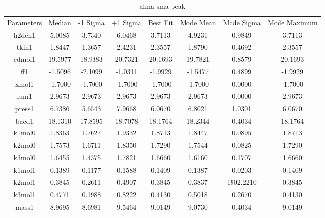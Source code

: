 \begin{table}
\caption{alma sma peak}
\begin{tabular}{cccccccc}
Parameters & Median & -1 Sigma & +1 Sigma & Best Fit & Mode Mean & Mode Sigma & Mode Maximum \\
h2den1 & 5.0085 & 3.7340 & 6.0468 & 3.7113 & 4.9231 & 0.9849 & 3.7113 \\
tkin1 & 1.8447 & 1.3657 & 2.4231 & 2.3557 & 1.8790 & 0.4692 & 2.3557 \\
cdmol1 & 19.5977 & 18.9383 & 20.7321 & 20.1693 & 19.7821 & 0.8579 & 20.1693 \\
ff1 & -1.5096 & -2.1099 & -1.0311 & -1.9929 & -1.5477 & 0.4899 & -1.9929 \\
xmol1 & -1.7000 & -1.7000 & -1.7000 & -1.7000 & -1.7000 & 0.0000 & -1.7000 \\
lum1 & 2.9673 & 2.9673 & 2.9673 & 2.9673 & 2.9673 & 0.0000 & 2.9673 \\
press1 & 6.7386 & 5.6543 & 7.9668 & 6.0670 & 6.8021 & 1.0301 & 6.0670 \\
bacd1 & 18.1310 & 17.8595 & 18.7078 & 18.1764 & 18.2344 & 0.4034 & 18.1764 \\
k1mol0 & 1.8363 & 1.7627 & 1.9332 & 1.8713 & 1.8447 & 0.0895 & 1.8713 \\
k2mol0 & 1.7573 & 1.6711 & 1.8350 & 1.7290 & 1.7544 & 0.0825 & 1.7290 \\
k3mol0 & 1.6455 & 1.4375 & 1.7821 & 1.6660 & 1.6160 & 0.1707 & 1.6660 \\
k1mol1 & 0.1389 & 0.1177 & 0.1588 & 0.1409 & 0.1387 & 0.0203 & 0.1409 \\
k2mol1 & 0.3845 & 0.2611 & 0.4907 & 0.3845 & 0.3837 & 1902.2210 & 0.3845 \\
k3mol1 & 0.4771 & 0.1988 & 0.8222 & 0.4130 & 0.5018 & 0.2670 & 0.4130 \\
mass1 & 8.9695 & 8.6981 & 9.5464 & 9.0149 & 9.0730 & 0.4034 & 9.0149 \\
\end{tabular}
\end{table}
